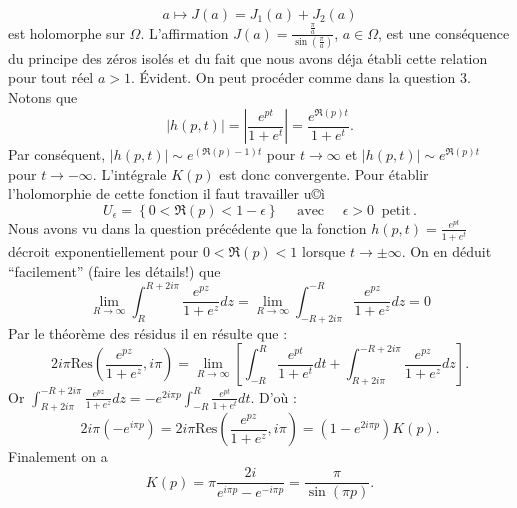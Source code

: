 {\begin{enumerate}
{$$a \mapsto J(a)=J_1(a)+J_2(a)$$
est holomorphe sur $\Omega$.
L'affirmation $J(a)= \frac{\frac{\pi}{a}}{\sin\left(\frac{\pi}{a}\right)}$, $a\in \Omega$, est une cons\'equence
du principe des z\'eros isol\'es et du fait que nous avons d\'eja \'etabli cette relation pour tout r\'eel $a>1$.
\'Evident.
On peut proc\'eder comme dans la question 3. Notons que
$$|h(p,t)| =\left| \frac{e^{pt}}{1+e^t}\right|=\frac{e^{\Re (p) t}}{1+e^t}.$$
Par cons\'equent, $|h(p,t) | \sim e^{(\Re (p) -1)t}$ pour $t\to\infty$ et
$|h(p,t) | \sim e^{\Re (p) t}$ pour $t\to -\infty$. L'int\'egrale $K(p)$
est donc convergente. Pour \'etablir l'holomorphie de cette fonction il faut travailler
u©ì$$U_\epsilon =\left\{ 0< \Re (p) < 1-\epsilon \right\} \quad\text{ avec } \quad \epsilon >0 \; \; \text{petit}\, .$$
Nous avons vu dans la question pr\'ec\'edente que la fonction $h(p,t)=\frac{e^{pt}}{1+e^t}$
d\'ecroit exponentiellement pour $0< \Re (p) < 1$ lorsque $t\to \pm \infty$. On en d\'eduit
``facilement'' (faire les d\'etails!) que
$$\lim_{R\to\infty }\int_R^{R+2i\pi}\frac{e^{pz}}{1+e^z}dz = \lim_{R\to\infty }\int_{-R+2i\pi}^{-R}\frac{e^{pz}}{1+e^z}dz =0$$
Par le th\'eor\`eme des r\'esidus il en r\'esulte que :
$$2i\pi \mathrm{Res} \left(\frac{e^{pz}}{1+e^z} , i\pi \right)= \lim_{R\to\infty}
\left[ \int_{-R}^{R}\frac{e^{pt}}{1+e^t}dt+ \int_{R+2i\pi}^{-R+2i\pi}\frac{e^{pz}}{1+e^z}dz\right].$$
Or $\int_{R+2i\pi}^{-R+2i\pi}\frac{e^{pz}}{1+e^z}dz= -e^{2i\pi p}\int_{-R}^{R}\frac{e^{pt}}{1+e^t}dt$.
D'o\`u :
$$2i\pi \left( -e^{i\pi p }\right) = 2i\pi \mathrm{Res} \left(\frac{e^{pz}}{1+e^z} , i\pi \right)
=\left( 1-e^{2i\pi p}\right) K(p).$$
Finalement on a
$$K(p)=\pi \frac{2i}{e^{i\pi p}-e^{-i\pi p}} =\frac{\pi}{\sin (\pi p)}.$$
}
\end{enumerate}
}
